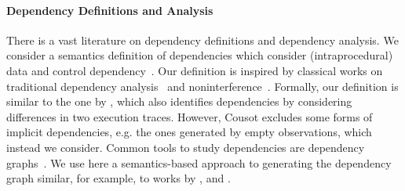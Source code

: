 



\paragraph{Dependency Definitions and Analysis} 
There is a vast literature on dependency definitions and dependency analysis. 
We consider a semantics definition of dependencies which consider (intraprocedural) data and control dependency~\cite{bilardi1996framework,cytron1991efficiently,pollock1989incremental}.    
Our definition is inspired by classical works on traditional dependency analysis~\cite{DenningD77} and noninterference~\cite{GoguenM82a}.
Formally, our definition is similar to the one by \citet{Cousot19a}, which also identifies dependencies by considering differences in two execution traces. 
However, Cousot excludes some forms of implicit dependencies, e.g. the ones generated by empty observations,  which instead we consider. 
%
Common tools to study dependencies are dependency graphs~\cite{ferrante1987program}. We use here a semantics-based approach to generating the dependency graph similar, for example, to works by \citet{austin1992dynamic}, \citet{hammer2006dynamic} and \cite{mastroeni2008data}.
